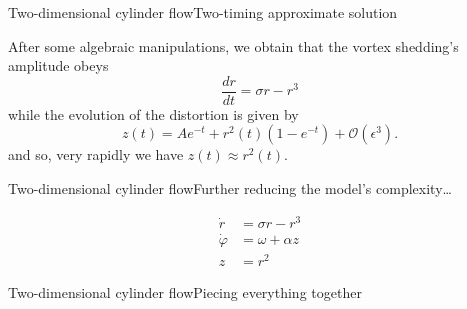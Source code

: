 \documentclass[usenames,dvipsnames,svgnames,10pt,aspectratio=169]{beamer}
\begin{document}
\begin{frame}[t, c]{Two-dimensional cylinder flow}{Two-timing approximate solution}
  \begin{minipage}{.68\textwidth}
    After some algebraic manipulations, we obtain that the vortex shedding's amplitude obeys
    \[
    \dfrac{dr}{dt} = \sigma  r - r^3
    \]
    while the evolution of the distortion is given by
    \[
    z(t) = A e^{-t} + r^2(t) \left(1 - e^{-t}\right) + \mathcal{O}(\epsilon^3).
    \]
    and so, very rapidly we have $z(t) \approx r^2(t)$.
  \end{minipage}%
  \hfill
  \begin{minipage}{.28\textwidth}
  \end{minipage}
\end{frame}




\begin{frame}[t, c]{Two-dimensional cylinder flow}{Further reducing the model's complexity\ldots}
  \begin{minipage}{.48\textwidth}
    \[
    \begin{aligned}
      \dot{r} & = \sigma r - r^3 \\
    \dot{\varphi} & = \omega + \alpha z \\
    z & = r^2
    \end{aligned}
    \]
  \end{minipage}%
  \hfill
  \begin{minipage}{.48\textwidth}

  \end{minipage}
\end{frame}




\begin{frame}[t, c]{Two-dimensional cylinder flow}{Piecing everything together}

\end{frame}
\end{document}
